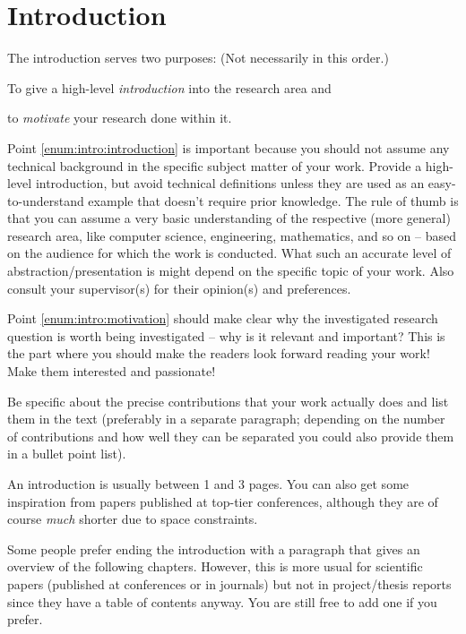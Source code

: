\chapter{Introduction}


The introduction serves two purposes: \hfill (Not necessarily in this order.)
\begin{compactenum}
  \item To give a high-level \emph{introduction} into the research area and\label{enum:intro:introduction}
  \item to \emph{motivate} your research done within it.\label{enum:intro:motivation}
\end{compactenum}

Point \ref{enum:intro:introduction} is important because you should not assume any technical background in the specific subject matter of your work. Provide a high-level introduction, but avoid technical definitions unless they are used as an easy-to-understand example that doesn't require prior knowledge. The rule of thumb is that you can assume a very basic understanding of the respective (more general) research area, like computer science, engineering, mathematics, and so on -- based on the audience for which the work is conducted. What such an accurate level of abstraction/presentation is might depend on the specific topic of your work. Also consult your supervisor(s) for their opinion(s) and preferences. 

Point \ref{enum:intro:motivation} should make clear why the investigated research question is worth being investigated -- why is it relevant and important? This is the part where you should make the readers look forward reading your work! Make them interested and passionate!

Be specific about the precise contributions that your work actually does and list them in the text (preferably in a separate paragraph; depending on the number of contributions and how well they can be separated you could also provide them in a bullet point list).

An introduction is usually between 1 and 3 pages. You can also get some inspiration from papers published at top-tier conferences, although they are of course \emph{much} shorter due to space constraints.

Some people prefer ending the introduction with a paragraph that gives an overview of the following chapters. However, this is more usual for scientific papers (published at conferences or in journals) but not in project/thesis reports since they have a table of contents anyway. You are still free to add one if you prefer.
